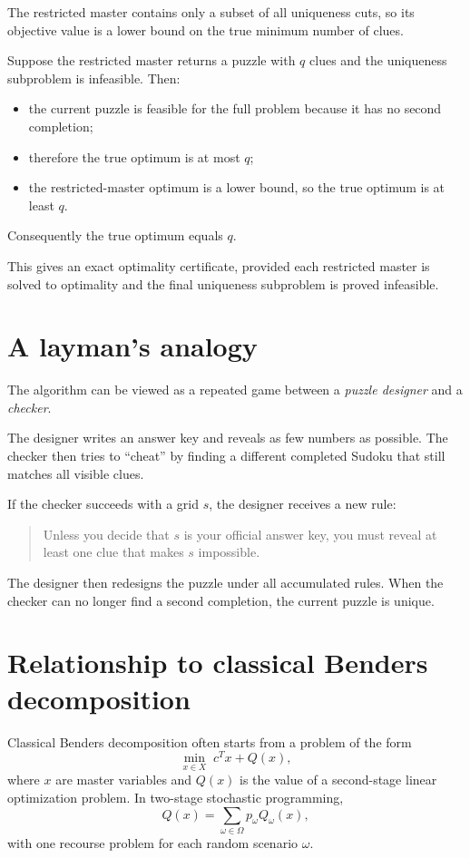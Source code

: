 \documentclass[11pt]{article}
\begin{document}
The restricted master contains only a subset of all uniqueness cuts, so its objective value is a lower bound on the true minimum number of clues.

Suppose the restricted master returns a puzzle with $q$ clues and the uniqueness subproblem is infeasible. Then:
\begin{itemize}
    \item the current puzzle is feasible for the full problem because it has no second completion;
    \item therefore the true optimum is at most $q$;
    \item the restricted-master optimum is a lower bound, so the true optimum is at least $q$.
\end{itemize}
Consequently the true optimum equals $q$.

This gives an exact optimality certificate, provided each restricted master is solved to optimality and the final uniqueness subproblem is proved infeasible.

\section{A layman's analogy}

The algorithm can be viewed as a repeated game between a \emph{puzzle designer} and a \emph{checker}.

The designer writes an answer key and reveals as few numbers as possible. The checker then tries to ``cheat'' by finding a different completed Sudoku that still matches all visible clues.

If the checker succeeds with a grid $s$, the designer receives a new rule:
\begin{quote}
Unless you decide that $s$ is your official answer key, you must reveal at least one clue that makes $s$ impossible.
\end{quote}
The designer then redesigns the puzzle under all accumulated rules. When the checker can no longer find a second completion, the current puzzle is unique.

\section{Relationship to classical Benders decomposition}

Classical Benders decomposition often starts from a problem of the form
\begin{equation}
\min_{x\in X}\; c^Tx + Q(x),
\end{equation}
where $x$ are master variables and $Q(x)$ is the value of a second-stage linear optimization problem. In two-stage stochastic programming,
\begin{equation}
Q(x)=\sum_{\omega\in\Omega}p_\omega Q_\omega(x),
\end{equation}
with one recourse problem for each random scenario $\omega$.
\end{document}
